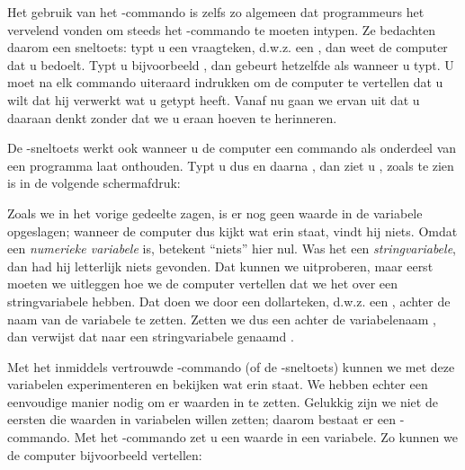 Het gebruik van het -commando is zelfs zo algemeen dat programmeurs het vervelend vonden om steeds het -commando te moeten intypen. Ze bedachten daarom een sneltoets: typt u een vraagteken, d.w.z. een , dan weet de computer dat u  bedoelt. Typt u bijvoorbeeld , dan gebeurt hetzelfde als wanneer u  typt. U moet na elk commando uiteraard  indrukken om de computer te vertellen dat u wilt dat hij verwerkt wat u getypt heeft. Vanaf nu gaan we ervan uit dat u daaraan denkt zonder dat we u eraan hoeven te herinneren.

\needspace{4cm} %
De -sneltoets werkt ook wanneer u de computer een commando als onderdeel van een programma laat onthouden. Typt u dus  en daarna , dan ziet u , zoals te zien is in de volgende schermafdruk:


Zoals we in het vorige gedeelte zagen, is er nog geen waarde in de variabele  opgeslagen; wanneer de computer dus kijkt wat erin staat, vindt hij niets. Omdat  een {\em numerieke variabele} is, betekent ``niets'' hier nul. Was het een {\em stringvariabele}, dan had hij letterlijk niets gevonden. Dat kunnen we uitproberen, maar eerst moeten we uitleggen hoe we de computer vertellen dat we het over een stringvariabele hebben. Dat doen we door een dollarteken, d.w.z. een \screentextwide{\$}, achter de naam van de variabele te zetten. Zetten we dus een \screentextwide{\$} achter de variabelenaam , dan verwijst dat naar een stringvariabele genaamd .

\needspace{4cm} %
Met het inmiddels vertrouwde -commando (of de -sneltoets) kunnen we met deze variabelen experimenteren en bekijken wat erin staat. We hebben echter een eenvoudige manier nodig om er waarden in te zetten. Gelukkig zijn we niet de eersten die waarden in variabelen willen zetten; daarom bestaat er een -commando. Met het -commando zet u een waarde in een variabele. Zo kunnen we de computer bijvoorbeeld vertellen:

